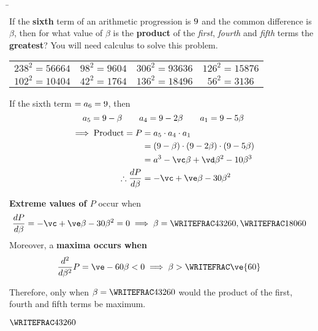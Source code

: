 
\renewcommand\vk{5}


\SQUARE\va\vb
\MULTIPLY\vb\va\b
\MULTIPLY{}\vc
\MULTIPLY{}\vd
\MULTIPLY{}\ve

\question[4] If the \textbf{sixth} term of an arithmetic progression is $9$ and the common difference 
is $\beta$, then for what value of $\beta$ is the \textbf{product} of the 
\textit{first}, \textit{fourth} and \textit{fifth} terms the \textbf{greatest}? 
You will need calculus to solve this problem.

\begin{calcaid}
  \begin{tabular}{c c c c}
    $238^2=56664$ & $98^2=9604$ & $306^2=93636$ & $126^2=15876$ \\
    $102^2=10404$ & $42^2=1764$ & $136^2=18496$ & $56^2=3136$
  \end{tabular}
\end{calcaid}

\watchout

\begin{solution}[\fullpage]
	If the sixth term $=a_6 = 9$, then  
  \[ a_5 = \va-\beta\qquad a_4 = \va-2\beta\qquad a_1 = \va-\vk\beta \] 
	\begin{align}
		\implies \text{Product} = P &= a_5\cdot a_4\cdot a_1 \\ 
    &= (\va-\beta)\cdot(\va-2\beta)\cdot(\va-5\beta) \\
    &= a^3-\vc\beta + \vd\beta^2 -10\beta^3 \\
    \therefore\dfrac{dP}{d\beta} &= -\vc + \ve\beta - 30\beta^2
	\end{align}
	
  \textbf{Extreme values of $P$} occur when 
  \begin{align}
    \dfrac{dP}{d\beta} &= -\vc + \ve\beta - 30\beta^2 = 0 \implies\beta = \WRITEFRAC\vx{60},\WRITEFRAC\vy{60}
  \end{align}
  Moreover, a \textbf{maxima occurs when}
  \begin{align}
    \dfrac{d^2}{d\beta^2}P &= \ve-60\beta < 0 \implies\beta > \WRITEFRAC\ve{60}
  \end{align}

  Therefore, only when $\beta=\WRITEFRAC\vx{60}$ would the product of the first, fourth 
  and fifth terms be maximum.
\end{solution}
\ifprintanswers\begin{codex}$\WRITEFRAC\vx{60}$\end{codex}\fi
